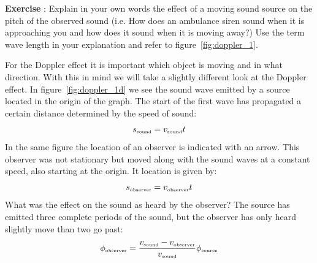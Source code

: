 \documentclass[12pt,a4paper]{article}
\numberwithin{equation}{section}
\numberwithin{figure}{section}
\newcounter{Exercise}
\numberwithin{table}{section}
\begin{document}
\begin{shaded}
\textbf{Exercise \theExercise {}} : Explain in your own words the effect of a moving sound source on the pitch of the observed sound (i.e. How does an ambulance siren sound when it is approaching you and how does it sound when it is moving away?) Use the term wave length in your explanation and refer to figure~\ref{fig:doppler_1}.\end{shaded}

For the Doppler effect it is important which object is moving and in what direction. With this in mind we will take a slightly different look at the Doppler effect. In figure~\ref{fig:doppler_1d} we see the sound wave emitted by a source located in the origin of the graph. The start of the first wave has propagated a certain distance determined by the speed of sound:
\begin{equation*}
s_{\mbox{\begin{tiny}sound\end{tiny}}}=v_{\mbox{\begin{tiny}sound\end{tiny}}} t
\end{equation*}
In the same figure the location of an observer is indicated with an arrow. This observer was not stationary but moved along with the sound waves at a constant speed, also starting at the origin. It location is given by:
\begin{equation*}
s_{\mbox{\begin{tiny}observer\end{tiny}}}=v_{\mbox{\begin{tiny}observer\end{tiny}}} t
\end{equation*}
What was the effect on the sound as heard by the observer? The source has emitted three complete periods of the sound, but the observer has only heard slightly move than two go past:
\begin{equation*}
\phi_{\mbox{\begin{tiny}observer\end{tiny}}} = \frac{v_{\mbox{\begin{tiny}sound\end{tiny}}} - v_{\mbox{\begin{tiny}observer\end{tiny}}}}{v_{\mbox{\begin{tiny}sound\end{tiny}}}} \phi_{\mbox{\begin{tiny}source\end{tiny}}}
\end{equation*}
\end{document}
